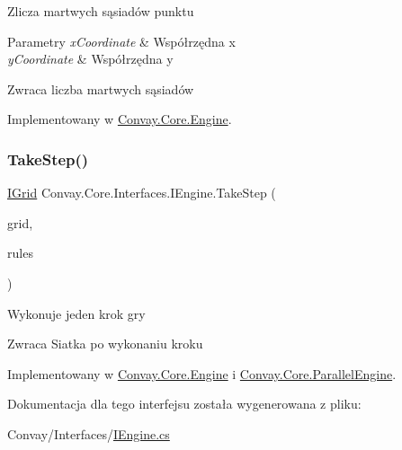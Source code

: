 Zlicza martwych sąsiadów punktu 


\begin{DoxyParams}{Parametry}
{\em x\+Coordinate} & Współrzędna x\\
\hline
{\em y\+Coordinate} & Współrzędna y\\
\hline
\end{DoxyParams}
\begin{DoxyReturn}{Zwraca}
liczba martwych sąsiadów
\end{DoxyReturn}


Implementowany w \hyperlink{class_convay_1_1_core_1_1_engine_a51ab6b04c07f0803751d8013b422cc3d}{Convay.\+Core.\+Engine}.

\hypertarget{interface_convay_1_1_core_1_1_interfaces_1_1_i_engine_a58f031ed5f145506e9dd1e6067c683a5}{}\label{interface_convay_1_1_core_1_1_interfaces_1_1_i_engine_a58f031ed5f145506e9dd1e6067c683a5} 
\subsubsection{\texorpdfstring{Take\+Step()}{TakeStep()}}
{\footnotesize\ttfamily \hyperlink{interface_convay_1_1_core_1_1_interfaces_1_1_i_grid}{I\+Grid} Convay.\+Core.\+Interfaces.\+I\+Engine.\+Take\+Step (\begin{DoxyParamCaption}\item[{\hyperlink{interface_convay_1_1_core_1_1_interfaces_1_1_i_grid}{I\+Grid}}]{grid,  }\item[{\hyperlink{interface_convay_1_1_core_1_1_interfaces_1_1_i_rules}{I\+Rules}}]{rules }\end{DoxyParamCaption})}



Wykonuje jeden krok gry 

\begin{DoxyReturn}{Zwraca}
Siatka po wykonaniu kroku
\end{DoxyReturn}


Implementowany w \hyperlink{class_convay_1_1_core_1_1_engine_a02713f5cb5242a65d2e1816512e0b791}{Convay.\+Core.\+Engine} i \hyperlink{class_convay_1_1_core_1_1_parallel_engine_a32e4a4911dcbb74f555b99944940d921}{Convay.\+Core.\+Parallel\+Engine}.



Dokumentacja dla tego interfejsu została wygenerowana z pliku\+:\begin{DoxyCompactItemize}
\item 
Convay/\+Interfaces/\hyperlink{_i_engine_8cs}{I\+Engine.\+cs}\end{DoxyCompactItemize}
